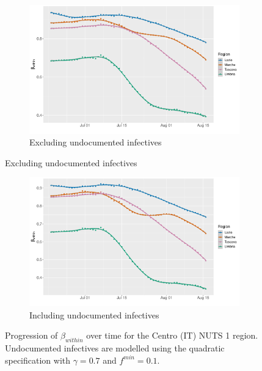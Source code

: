 \documentclass[12pt]{article}
\begin{document}
\begin{appendices}
		\begin{figure}[H]
    	    \centering
    	    \begin{subfigure}{\textwidth}
    	      \centering
    	      \includegraphics[width=0.94\linewidth]{output/model_within_lag14_betawithin_Centro (IT)_rolling.pdf}
    	      \caption{Excluding undocumented infectives}
    	      \label{fig:beta_within_over_time_centro_regular}
    	    \end{subfigure}
        \end{figure}
        \begin{figure}[H]\ContinuedFloat
    	    \begin{subfigure}{\textwidth}
    	      \centering
    	      \includegraphics[width=0.94\linewidth]{output/model_within_lag14_betawithin_Centro (IT)_UndocQuadratic_rolling.pdf}
    	      \caption{Including undocumented infectives}
    	      \label{fig:beta_within_over_time_centro_regular_undoc}
    	    \end{subfigure}
    	    \caption{Progression of $\beta_{within}$ over time for the Centro (IT) NUTS 1 region. Undocumented infectives are modelled using the quadratic specification with $\gamma = 0.7$ and $f^{min}=0.1$.}
    	    \label{fig:beta_within_over_time_centro}
	    \end{figure}
		

\end{appendices}
\end{document}
